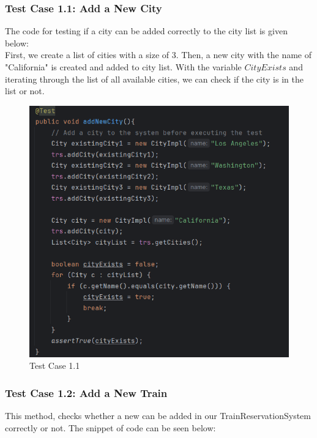 \documentclass{article}
\begin{document}
\subsubsection{Test Case 1.1: Add a New City}
The code for testing if a city can be added correctly to the city list is given below:\\
First, we create a list of cities with a size of 3. Then, a new city with the name of "California" is created and added to city list. With the variable $CityExists$ and iterating through the list of all available cities, we can check if the city is in the list or not.
\begin{figure}[h]
  \centering
  \includegraphics[width=1.0\textwidth]{pictures/T1-1.png}
  \caption{Test Case 1.1}
  \label{fig:your_label}
\end{figure}

\pagebreak

\subsubsection{Test Case 1.2: Add a New Train}
This method, checks whether a new can be added in our TrainReservationSystem correctly or not. The snippet of code can be seen below:
\end{document}
